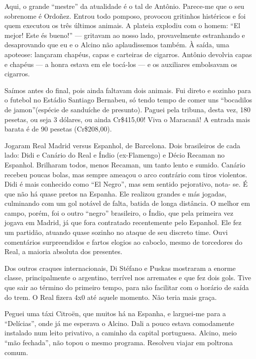 Aqui, o grande ``mestre'' da atualidade é o tal de Antônio. Parece-me que o seu sobrenome é Ordoñez. Entrou todo pomposo, provocou gritinhos histéricos e foi quem executou os três últimos animais. A plateia explodiu com o homem: ``El mejor! Este és bueno!'' --- gritavam ao nosso lado, provavelmente estranhando e desaprovando que eu e o Alcino não aplaudissemos também. À saída, uma apoteose: lançaram chapéus, capas e carteiras de cigarros. Antônio devolvia capas e chapéus --- a honra estava em ele tocá-los --- e os auxiliares embolsavam os cigarros.

Saímos antes do final, pois ainda faltavam dois animais. Fui direto e sozinho para o futebol no Estádio Santiago Bernabeu, só tendo tempo de comer uns ``bocadilos de jamon''(espécie de sanduíche de presunto). Paguei pela tribuna, desta vez, 180 pesetas, ou seja 3 dólares, ou ainda Cr\$415,00! Viva o Maracanã! A entrada mais barata é de 90 pesetas (Cr\$208,00).

Jogaram Real Madrid versus Espanhol, de Barcelona. Dois brasileiros de cada lado: Didi e Canário do Real e Índio (ex-Flamengo) e Décio Recaman no Espanhol. Brilharam todos, menos Recaman, um tanto lento e sumido. Canário recebeu poucas bolas, mas sempre ameaçou o arco contrário com tiros violentos. Didi é mais conhecido como ``El Negro'', mas sem sentido pejorativo, nota- se. É que não há quase pretos na Espanha. Ele realizou grandes e más jogadas, culminando com um gol notável de falta, batida de longa distância. O melhor em campo, porém, foi o outro ``negro'' brasileiro, o Índio, que pela primeira vez jogava em Madrid, já que fora contratado recentemente pelo Espanhol. Ele fez um partidão, atuando quase sozinho no ataque de seu discreto time. Ouvi comentários surpreendidos e fartos elogios ao caboclo, mesmo de torcedores do Real, a maioria absoluta dos presentes.

Dos outros craques internacionais, Di Stéfano e Puskas mostraram a enorme classe, principalmente o argentino, terrível nos arremates e que fez dois gols. Tive que sair ao término do primeiro tempo, para não facilitar com o horário de saída do trem. O Real fizera 4x0 até aquele momento. Não teria mais graça.

Peguei uma táxi Citroën, que muitos há na Espanha, e larguei-me para a ``Delícias'', onde já me esperava o Alcino. Dali a pouco estava comodamente instalado num leito privativo, a caminho da capital portuguesa. Alcino, meio ``mão fechada'', não topou o mesmo programa. Resolveu viajar em poltrona comum.

